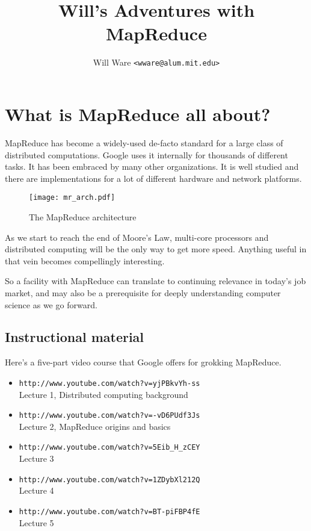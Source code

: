 \documentclass[11pt]{article}
\title{Will's Adventures with MapReduce}
\author{Will Ware \texttt{<wware@alum.mit.edu>}}
\date{}
\begin{document}
\thispagestyle{plain}
\maketitle

\tableofcontents
{}

\section{What is MapReduce all about?}

MapReduce has become a widely-used de-facto standard for a large class
of distributed computations. Google uses it internally for thousands
of different tasks. It has been embraced by many other organizations.
It is well studied and there are implementations for a lot of
different hardware and network platforms.

\begin{figure}
\begin{center}
\texttt{[image: mr\_arch.pdf]}
\end{center}
\caption{The MapReduce architecture}
\label{F:architecture}
\end{figure}

As we start to reach the end of Moore's Law, multi-core processors and
distributed computing will be the only way to get more speed. Anything
useful in that vein becomes compellingly interesting.

So a facility with MapReduce can translate to continuing relevance in
today's job market, and may also be a prerequisite for deeply
understanding computer science as we go forward.

\subsection{Instructional material}

Here's a five-part video course that Google offers for grokking MapReduce.

\begin{itemize}
\item{\tt http://www.youtube.com/watch?v=yjPBkvYh-ss} \\ Lecture 1, Distributed computing background
\item{\tt http://www.youtube.com/watch?v=-vD6PUdf3Js} \\ Lecture 2, MapReduce origins and basics
\item{\tt http://www.youtube.com/watch?v=5Eib\_H\_zCEY} \\ Lecture 3
\item{\tt http://www.youtube.com/watch?v=1ZDybXl212Q} \\ Lecture 4
\item{\tt http://www.youtube.com/watch?v=BT-piFBP4fE} \\ Lecture 5
\end{itemize}
\end{document}
